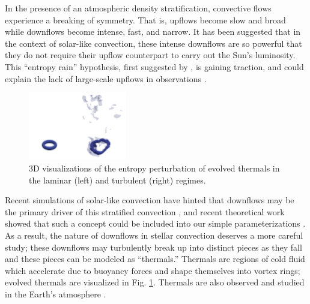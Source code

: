 \documentclass[11pt, preprint]{aastex}
\begin{document}
In the presence of an atmospheric density stratification, convective flows experience a breaking of symmetry.
That is, upflows become slow and broad while downflows become intense, fast, and narrow.
It has been suggested that in the context of solar-like convection, these intense downflows are so powerful that they do not require their upflow counterpart to carry out the Sun's luminosity.
This ``entropy rain'' hypothesis, first suggested by \citet{spruit1997}, is gaining traction, and could explain the lack of large-scale upflows in observations \citep{hanasoge&all2015}.
\begin{figure}
	\begin{center}
	\vspace{-10pt}
    \includegraphics[width=0.38\textwidth]{./figs/thermals_comparison.png}
	\vspace{-16pt}
	\end{center}
    \caption{
	3D visualizations of the entropy perturbation of evolved thermals in the laminar (left) and turbulent (right) regimes.
	\label{fig:thermals_comparison} }
	\vspace{-11pt}
\end{figure}
Recent simulations of solar-like convection have hinted that downflows may be the primary driver of this stratified convection \citep{kapyla&all2017}, and recent theoretical work showed that such a concept could be included into our simple parameterizations \citep{brandenburg2016}.
As a result, the nature of downflows in stellar convection deserves a more careful study; these downflows may turbulently break up into distinct pieces as they fall and these pieces can be modeled as ``thermals.''
Thermals are regions of cold fluid which accelerate due to buoyancy forces and shape themselves into vortex rings; evolved thermals are visualized in Fig. \ref{fig:thermals_comparison}.
Thermals are also observed and studied in the Earth's atmosphere \citep{lecoanet&jeevanjee2019}.
\end{document}
